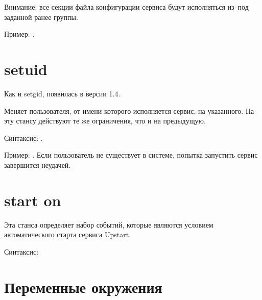 Внимание: все секции файла конфигурации сервиса будут исполняться из--под заданной ранее группы. 

Пример: .
\section{setuid} \label{sec:Secuid}
Как и setgid, появилась в версии 1.4. 

Меняет пользователя, от имени которого исполняется сервис, на указанного. На эту стансу действуют те же ограничения, что и на предыдущую.

Синтаксис: . 

Пример: . Если пользователь не существует в системе, попытка запустить сервис завершится неудачей.
\section{start on} \label{sec:StartOn}
Эта станса определяет набор событий, которые являются условием автоматического старта сервиса Upstart.

Синтаксис: 
\section{Переменные окружения} \label{sec:EnviromentVariables}